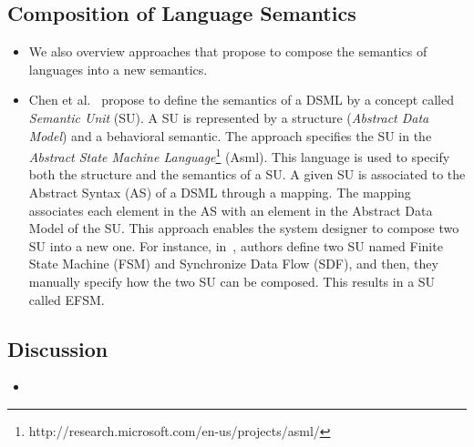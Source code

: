 	\subsection{Composition of Language Semantics}
	\begin{itemize} 
		
		\item  We also overview approaches that propose to compose the semantics of languages into a new semantics.
		
		\item Chen et al.~\cite{semanticsanchoring} propose to define the semantics of a DSML by a concept called \emph{Semantic Unit} (SU). A SU is represented by a structure (\emph{Abstract Data Model}) and a behavioral semantic. The approach specifies the SU in the \emph{Abstract State Machine Language}\footnote{http://research.microsoft.com/en-us/projects/asml/} (Asml). This language is used to specify both the structure and the semantics of a SU. A given SU is associated to the Abstract Syntax (AS) of a DSML through a mapping. The mapping associates each element in the AS with an element in the Abstract Data Model of the SU. This approach  enables the system designer to compose two SU into a new one. For instance, in~\cite{composemanticanch}, authors define two SU named Finite State Machine (FSM) and Synchronize Data Flow (SDF), and then, they manually specify how the two SU can be composed. This results in a SU called EFSM.  
		
	\end{itemize}
	
	\subsection{Discussion}
		\begin{itemize}
			\item  {} 
		\end{itemize}
